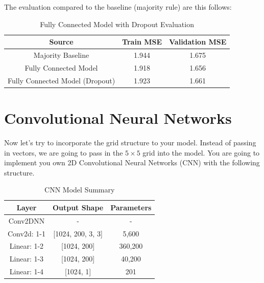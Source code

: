 \documentclass[12pt, a4paper]{article}
\begin{document}
                \noindent The evaluation compared to the baseline (majority rule) are this follows:
                \begin{table}[h]
                    \centering
                    \begin{tabular}{|c|c|c|}
                        \hline
                        \textbf{Source} & \textbf{Train MSE} & \textbf{Validation MSE} \\
                        \hline \hline
                        Majority Baseline & 1.944 & 1.675 \\
                        Fully Connected Model & 1.918 & 1.656 \\
                        Fully Connected Model (Dropout) & 1.923 & 1.661 \\
                        \hline
                    \end{tabular}
                    \caption{Fully Connected Model with Dropout Evaluation}
                \end{table}

    \pagebreak

    \part{Convolutional Neural Networks}
        Now let's try to incorporate the grid structure to your model.
        Instead of passing in vectors, we are going to pass in the $5 \times 5$ grid into the model.
        You are going to implement you own 2D Convolutional Neural Networks (CNN) with the following structure.

        \begin{table}[h]
            \centering
            \begin{tabular}{|c|c|c|}
                \hline
                \textbf{Layer} & \textbf{Output Shape} & \textbf{Parameters} \\
                \hline \hline
                Conv2DNN & - & - \\
                Conv2d: 1-1 & [1024, 200, 3, 3] & 5,600 \\
                Linear: 1-2 & [1024, 200] & 360,200 \\
                Linear: 1-3 & [1024, 200] & 40,200 \\
                Linear: 1-4 & [1024, 1] & 201 \\
                \hline
            \end{tabular}
            \caption{CNN Model Summary}
        \end{table}
\end{document}
